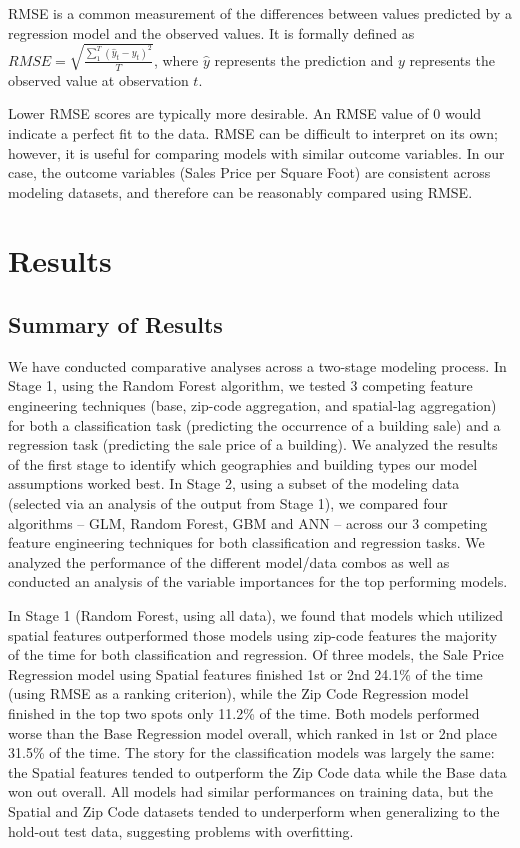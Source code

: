 \documentclass[12pt,]{article}
\begin{document}
RMSE is a common measurement of the differences between values predicted
by a regression model and the observed values. It is formally defined as
\(RMSE = \sqrt{ \frac{\sum_{1}^{T} (\hat{y}_t - y_t)^2}{T} }\), where
\(\hat{y}\) represents the prediction and \(y\) represents the observed
value at observation \(t\).

Lower RMSE scores are typically more desirable. An RMSE value of 0 would
indicate a perfect fit to the data. RMSE can be difficult to interpret
on its own; however, it is useful for comparing models with similar
outcome variables. In our case, the outcome variables (Sales Price per
Square Foot) are consistent across modeling datasets, and therefore can
be reasonably compared using RMSE.

\hypertarget{results}{%
\section{Results}\label{results}}

\hypertarget{summary-of-results}{%
\subsection{Summary of Results}\label{summary-of-results}}

We have conducted comparative analyses across a two-stage modeling
process. In Stage 1, using the Random Forest algorithm, we tested 3
competing feature engineering techniques (base, zip-code aggregation,
and spatial-lag aggregation) for both a classification task (predicting
the occurrence of a building sale) and a regression task (predicting the
sale price of a building). We analyzed the results of the first stage to
identify which geographies and building types our model assumptions
worked best. In Stage 2, using a subset of the modeling data (selected
via an analysis of the output from Stage 1), we compared four algorithms
-- GLM, Random Forest, GBM and ANN -- across our 3 competing feature
engineering techniques for both classification and regression tasks. We
analyzed the performance of the different model/data combos as well as
conducted an analysis of the variable importances for the top performing
models.

In Stage 1 (Random Forest, using all data), we found that models which
utilized spatial features outperformed those models using zip-code
features the majority of the time for both classification and
regression. Of three models, the Sale Price Regression model using
Spatial features finished 1st or 2nd 24.1\% of the time (using RMSE as a
ranking criterion), while the Zip Code Regression model finished in the
top two spots only 11.2\% of the time. Both models performed worse than
the Base Regression model overall, which ranked in 1st or 2nd place
31.5\% of the time. The story for the classification models was largely
the same: the Spatial features tended to outperform the Zip Code data
while the Base data won out overall. All models had similar performances
on training data, but the Spatial and Zip Code datasets tended to
underperform when generalizing to the hold-out test data, suggesting
problems with overfitting.
\end{document}
